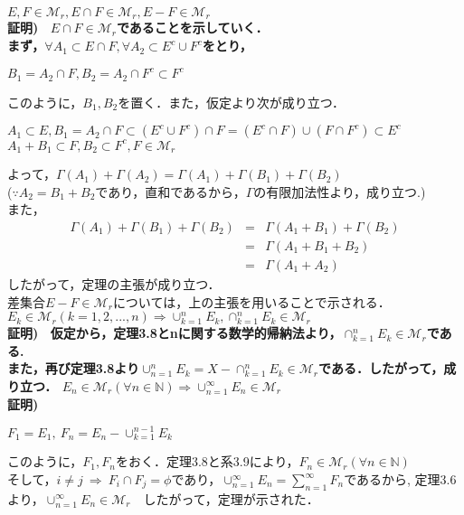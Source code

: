 \documentclass[11pt, a4paper, dvipdfmx]{jsarticle}
\theoremstyle{definition}
\renewcommand{\proofname}{\bfseries Proof}
\renewcommand{\proofname}{\bfseries 証明}
\newcommand{\N}{\mathbb{N}}
\begin{document}
\Theorem $E,F\in \mathcal{M}_r,E\cap F\in \mathcal{M}_r,E-F\in \mathcal{M}_r$\\
\proofname)~ $E\cap F\in \mathcal{M}_r$であることを示していく．\\
まず，$\forall A_1 \subset E\cap F,\forall A_2 \subset E^c\cup F^c$をとり，
\begin{center}
  $B_1 = A_2\cap F, B_2 = A_2\cap F^c\subset F^c$
\end{center}
このように，$B_1,B_2$を置く．また，仮定より次が成り立つ．
\begin{center}
  $A_1\subset E,B_1=A_2\cap F \subset (E^c\cup F^c)\cap F = (E^c\cap F)\cup(F\cap F^c)\subset E^c$\\
  $A_1+B_1\subset F, B_2\subset F^c,F\in \mathcal{M}_r$
\end{center}
 よって，$\Gamma(A_1)+\Gamma(A_2) = \Gamma(A_1)+\Gamma(B_1)+\Gamma(B_2)$\\
 ($\because A_2 = B_1+B_2$であり，直和であるから，$\Gamma$の有限加法性より，成り立つ.)\\
 また，
\begin{eqnarray*}
 \Gamma(A_1)+\Gamma(B_1)+\Gamma(B_2) &=& \Gamma(A_1+B_1)+\Gamma(B_2)\\
  &=&\Gamma(A_1+B_1+B_2)\\
   &=& \Gamma(A_1+A_2)
\end{eqnarray*}
したがって，定理の主張が成り立つ．\\
差集合$E-F\in \mathcal{M}_r$については，上の主張を用いることで示される．\\

\Corollary $E_k\in \mathcal{M}_r(k = 1,2,...,n)\Rightarrow \cup^{n}_{k=1}E_k,\cap^{n}_{k=1}E_k \in \mathcal{M}_r$\\
\proofname)~ 仮定から，定理3.8とnに関する数学的帰納法より，$\cap^{n}_{k=1}E_k \in \mathcal{M}_r$である.\\
また，再び定理3.8より$\cup^{n}_{n=1}E_k = X-\cap^{n}_{k=1}E_k \in \mathcal{M}_r$である．したがって，成り立つ．
\Theorem $E_n \in \mathcal{M}_r(\forall n\in \N)\Rightarrow \cup^{\infty}_{n=1}E_n \in \mathcal{M}_r$\\
\proofname)
\begin{center}
  $F_1 = E_1,~F_n = E_n-\cup^{n-1}_{k=1}E_k$
\end{center}
このように，$F_1,F_n$をおく．定理3.8と系3.9により，$F_n\in \mathcal{M}_r(\forall n\in \N)$\\
そして，$i \neq j~ \Rightarrow~ F_i\cap F_j = \phi$であり，$\cup^{\infty}_{n=1}E_n = \sum^{\infty}_{n=1}F_n$であるから,
定理3.6より，$\cup^{\infty}_{n=1}E_n\in \mathcal{M}_r$　したがって，定理が示された．
\end{document}
